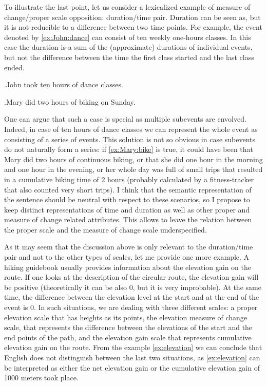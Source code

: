 To illustrate the last point, let us consider a lexicalized example of measure of change/proper scale opposition: duration/time pair. Duration can be seen as, but it is not reducible to a difference between two time points. For example, the event denoted by \ref{ex:John:dance} can consist of ten weekly one-hours classes. In this case the duration is a sum of the (approximate) durations of individual events, but not the difference between the time the first class started and the last class ended. 

\ex.\label{ex:John:dance}John took ten hours of dance classes.

\ex.\label{ex:Mary:bike}Mary did two hours of biking on Sunday. 

One can argue that such a case is special as multiple subevents are envolved. Indeed, in case of ten hours of dance classes we can represent the whole event as consisting of a series of events. This solution is not so obvious in case subevents do not naturally form a series: if \ref{ex:Mary:bike} is true, it could have been that Mary did two hours of continuous biking, or that she did one hour in the morning and one hour in the evening, or her whole day was full of small trips that resulted in a cumulative biking time of 2 hours (probably calculated by a fitness-tracker that also counted very short trips). I think that the semantic representation of the sentence should be neutral with respect to these scenarios, so I propose to keep distinct representations of time and duration as well as other proper and measure of change related attributes. This allows to leave the relation between the proper scale and the measure of change scale underspecified.

As it may seem that the discussion above is only relevant to the duration/time pair and not to the other types of scales, let me provide one more example. A hiking guidebook usually provides information about the elevation gain on the route. If one looks at the description of the circular route, the elevation gain will be positive (theoretically it can be also 0, but it is very improbable). At the same time, the difference between the elevation level at the start and at the end of the event is 0. In such situations, we are dealing with three different scales: a proper elevation scale that has heights as its points, the elevation measure of change scale, that represents the difference between the elevations of the start and the end points of the path, and the elevation gain scale that represents cumulative elevation gain on the route. From the example \ref{ex:elevation} we can conclude that English does not distinguish between the last two situations, as \ref{ex:elevation} can be interpreted as either the net elevation gain or the cumulative elevation gain of 1000 meters took place. 

